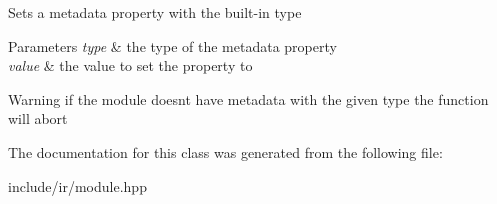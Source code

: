 Sets a metadata property with the built-\/in type 
\begin{DoxyParams}{Parameters}
{\em type} & the type of the metadata property \\
\hline
{\em value} & the value to set the property to \\
\hline
\end{DoxyParams}
\begin{DoxyWarning}{Warning}
if the module doesn\textquotesingle{}t have metadata with the given type the function will abort 
\end{DoxyWarning}


The documentation for this class was generated from the following file\+:\begin{DoxyCompactItemize}
\item 
include/ir/module.\+hpp\end{DoxyCompactItemize}
